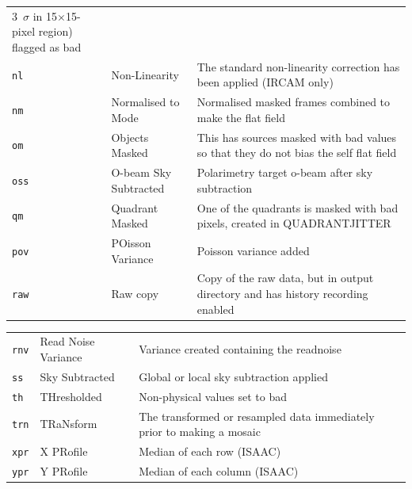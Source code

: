 \documentclass[twoside,11pt]{article}
\renewcommand{\_}{\texttt{\symbol{95}}}
\begin{document}
\begin{tabular}{llp{90mm}}
                                 3~$\sigma$ in 15$\times$15-pixel region) flagged as bad \\
{\tt\_nl}  & Non-Linearity     & The standard non-linearity correction has
                                 been applied (IRCAM only) \\
{\tt\_nm}  & Normalised to Mode & Normalised masked frames combined to make 
                                  the flat field \\
{\tt\_om } & Objects Masked    & This has sources masked with bad values
                                 so that they do not bias the self flat field \\
{\tt\_oss} & O-beam Sky Subtracted & Polarimetry target o-beam after sky subtraction \\
{\tt\_qm}  & Quadrant Masked   & One of the quadrants is masked with bad
                                 pixels, created in QUADRANT\_JITTER \\
{\tt\_pov} & POisson Variance  & Poisson variance added \\
{\tt\_raw} & Raw copy          & Copy of the raw data, but in output directory
                                 and has history recording enabled \\
\end{tabular}

\begin{tabular}{llp{90mm}}
{\tt\_rnv} & Read Noise Variance & Variance created containing the readnoise \\
{\tt\_ss}  & Sky Subtracted    & Global or local sky subtraction applied \\
{\tt\_th}  & THresholded       & Non-physical values set to bad \\
{\tt\_trn} & TRaNsform         & The transformed or resampled data immediately 
                                 prior to making a mosaic \\
{\tt\_xpr} & X PRofile         & Median of each row (ISAAC) \\
{\tt\_ypr} & Y PRofile         & Median of each column (ISAAC) \\
\end{tabular}
\end{document}
